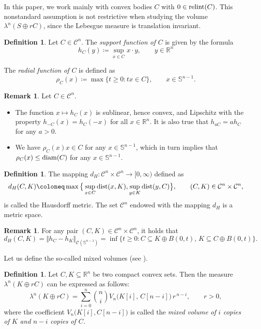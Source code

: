 \documentclass[pdflatex,sn-mathphys-num]{sn-jnl}
\theoremstyle{plain}
\theoremstyle{definition}
\newtheorem{definition}[theorem]{Definition}
\newtheorem{rem}[theorem]{Remark}
\DeclareMathOperator{\relint}{\textup{relint}}
\DeclareMathOperator{\dist}{\textup{dist}}
\DeclareMathOperator{\diam}{\textup{diam}}
\begin{document}
    In this paper, we work mainly with convex bodies $C$ with $0\in\relint(C)$. This nonstandard assumption is not restrictive when studying the volume $\lambda^n(S\oplus rC)$, since the Lebesgue measure is translation invariant.

    \begin{definition}
    Let $C\in\mathcal{C}^n$. The \textit{support function of $C$} is given by the formula $$h_C(y)\coloneq \sup_{x\in C}x\cdot y,\qquad y\in\mathbb{R}^n$$ 

     The \emph{radial function of $C$} is defined as $$\rho_{C}(x)\coloneq\max\{t\geq0 : tx\in C\}, \qquad x\in\mathbb{S}^{n-1}.$$
\end{definition}

\begin{rem} Let $C\in\mathcal{C}^n$.
    \begin{itemize}
        \item The function $x\mapsto h_C(x)$ is sublinear, hence convex, and Lipschitz with the property $h_{-C}(x)=h_{C}(-x)$ for all $x\in\mathbb{R}^n$. It is also true that $h_{aC}=ah_{C}$ for any $a>0$.
        \item We have $\rho_C(x)x\in C$ for any $x\in\mathbb{S}^{n-1}$, which in turn implies that $\rho_C(x)\leq\diam(C)$ for any $x\in\mathbb{S}^{n-1}.$
 \end{itemize}\end{rem}
\begin{definition}
    The mapping $d_H\colon \mathcal{C}^n\times\mathcal{C}^n\to[0, \infty)$ defined as $$d_H(C, K)\coloneq\max\big\{\sup_{x\in C}\dist(x, K), \sup_{y\in K}\dist(y, C)\big\},\qquad (C, K)\in\mathcal{C}^n\times\mathcal{C}^n,$$ is called the Hausdorff metric. The set $\mathcal{C}^n$ endowed with the mapping $d_H$ is a metric space.
\end{definition}
\begin{rem}
    For any pair $(C, K)\in\mathcal{C}^n\times\mathcal{C}^n$, it holds that $$d_H(C, K)=\Vert h_C-h_K\Vert_{\mathcal{C}(\mathbb{S}^{n-1})}=\inf\{t\geq 0 : C\subseteq K\oplus B(0, t),\, K\subseteq C\oplus B(0, t)\}.$$
\end{rem}

\medskip

Let us define the so-called mixed volumes (see \cite[Ch. 5]{rolf}).
\begin{definition}
    Let $C, K\subseteq\mathbb{R}^n$ be two compact convex sets. Then the measure $\lambda^n(K\oplus rC)$ can be expressed as follows:
\[
\lambda^n(K\oplus rC)
=\sum_{i=0}^n \binom{n}{i} V_n\bigl(K[i],\,C[n-i]\bigr)\,r^{\,n-i},\qquad r>0,
\]
where the coefficient $V_n\bigl(K[i],C[n-i]\bigr)$ is called the \emph{mixed volume of $i$ copies of $K$ and $n-i$ copies of $C$.}
\end{definition}
\end{document}

